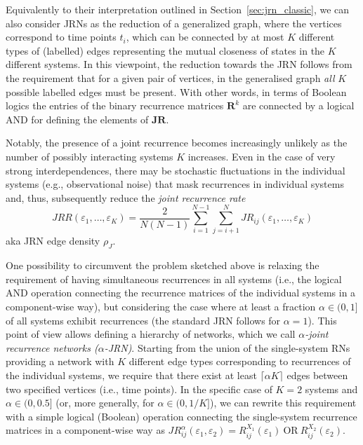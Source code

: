 \documentclass[graybox]{svmult}
\begin{document}
Equivalently to their interpretation outlined in Section~\ref{sec:jrn_classic}, we can also consider JRNs as the reduction of a generalized graph, where the vertices correspond to time points $t_i$, which can be connected by at most $K$ different types of (labelled) edges representing the mutual closeness of states in the $K$ different systems. In this viewpoint, the reduction towards the JRN follows from the requirement that for a given pair of vertices, in the generalised graph \emph{all} $K$ possible labelled edges must be present. With other words, in terms of Boolean logics the entries of the binary recurrence matrices $\mathbf{R}^k$ are connected by a logical AND for defining the elements of $\mathbf{JR}$.

Notably, the presence of a joint recurrence becomes increasingly unlikely as the number of possibly interacting systems $K$ increases. Even in the case of very strong interdependences, there may be stochastic fluctuations in the individual systems (e.g., observational noise) that mask recurrences in individual systems and, thus, subsequently reduce the \emph{joint recurrence rate}
\begin{equation}
JRR(\varepsilon_1,\dots,\varepsilon_K) = \frac{2}{N(N-1)} \sum_{i=1}^{N-1} \sum_{j=i+1}^N JR_{ij} (\varepsilon_1,\dots,\varepsilon_K)
\end{equation}
\noindent
aka JRN edge density $\rho_J$.

One possibility to circumvent the problem sketched above is relaxing the requirement of having simultaneous recurrences in all systems (i.e., the logical AND operation connecting the recurrence matrices of the individual systems in a component-wise way), but considering the case where at least a fraction $\alpha\in(0,1]$ of all systems exhibit recurrences (the standard JRN follows for $\alpha=1$). This point of view allows defining a hierarchy of networks, which we call \textit{$\alpha$-joint recurrence networks ($\alpha$-JRN)}. Starting from the union of the single-system RNs providing a network with $K$ different edge types corresponding to recurrences of the individual systems, we require that there exist at least $\lceil\alpha K\rceil$ edges between two specified vertices (i.e., time points). In the specific case of $K=2$ systems and $\alpha\in(0,0.5]$ (or, more generally, for $\alpha\in(0,1/K]$), we can rewrite this requirement with a simple logical (Boolean) operation connecting the single-system recurrence matrices in a component-wise way as $JR^{\alpha}_{ij}(\varepsilon_1,\varepsilon_2) = R^{X_1}_{ij}(\varepsilon_1)\ \mbox{OR}\ R^{X_2}_{ij}(\varepsilon_2)$.
\end{document}
